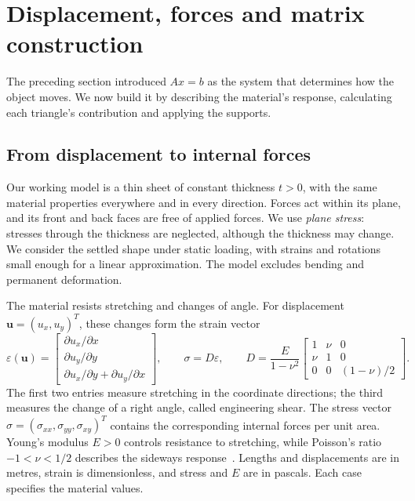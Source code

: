 \section{Displacement, forces and matrix construction}
\label{sec:mechanics-matrix}

The preceding section introduced $Ax=b$ as the system that determines
how the object moves. We now build it by describing the material's
response, calculating each triangle's contribution and applying the
supports.

\subsection{From displacement to internal forces}
Our working model is a thin sheet of constant thickness $t>0$, with the
same material properties everywhere and in every direction. Forces act
within its plane, and its front and back faces are free of applied
forces. We use \emph{plane stress}: stresses through the thickness are
neglected, although the thickness may change. We consider the settled
shape under static loading, with strains and rotations small enough for
a linear approximation. The model excludes bending and permanent deformation.

The material resists stretching and changes of angle. For displacement
$\mathbf{u}=(u_x,u_y)^T$, these changes form the strain vector
\begin{equation}
 \varepsilon(\mathbf{u})=
 \begin{bmatrix}
 \partial u_x/\partial x\\
 \partial u_y/\partial y\\
 \partial u_x/\partial y+\partial u_y/\partial x
 \end{bmatrix},\qquad
 \sigma=D\varepsilon,\qquad
 D=\frac{E}{1-\nu^2}
 \begin{bmatrix}1&\nu&0\\\nu&1&0\\0&0&(1-\nu)/2\end{bmatrix}.
 \label{eq:mechanics-material}
\end{equation}
The first two entries measure stretching in the coordinate directions;
the third measures the change of a right angle, called engineering
shear. The stress vector
$\sigma=(\sigma_{xx},\sigma_{yy},\sigma_{xy})^T$ contains the corresponding
internal forces per unit area. Young's modulus $E>0$ controls resistance
to stretching, while Poisson's ratio $-1<\nu<1/2$ describes the sideways
response~\cite{bleyer-plane-stress}. Lengths and displacements are in
metres, strain is dimensionless, and stress and $E$ are in pascals.
Each case specifies the material values.


